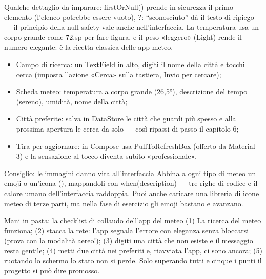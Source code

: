 Qualche dettaglio da imparare: firstOrNull() prende in sicurezza il primo elemento (l'elenco potrebbe essere vuoto), ?: “sconosciuto” dà il testo di ripiego — il principio della null safety vale anche nell'interfaccia. La temperatura usa un corpo grande come 72.sp per fare figura, e il peso «leggero» (Light) rende il numero elegante: è la ricetta classica delle app meteo.



\begin{itemize}
  \item Campo di ricerca: un TextField in alto, digiti il nome della città e tocchi cerca (imposta l'azione «Cerca» sulla tastiera, Invio per cercare);
  \item Scheda meteo: temperatura a corpo grande (26,5°), descrizione del tempo (sereno), umidità, nome della città;
  \item Città preferite: salva in DataStore le città che guardi più spesso e alla prossima apertura le cerca da solo — così ripassi di passo il capitolo 6;
  \item Tira per aggiornare: in Compose usa PullToRefreshBox (offerto da Material 3) e la sensazione al tocco diventa subito «professionale».
\end{itemize}

\begin{tcbinfo}{Consiglio: le immagini danno vita all'interfaccia}
Abbina a ogni tipo di meteo un emoji o un'icona (), mappandoli con when(description) — tre righe di codice e il calore umano dell'interfaccia raddoppia. Puoi anche caricare una libreria di icone meteo di terze parti, ma nella fase di esercizio gli emoji bastano e avanzano.

\end{tcbinfo}

\begin{tcbpractice}{Mani in pasta: la checklist di collaudo dell'app del meteo}
(1) La ricerca del meteo funziona; (2) stacca la rete: l'app segnala l'errore con eleganza senza bloccarsi (prova con la modalità aereo!); (3) digiti una città che non esiste e il messaggio resta gentile; (4) metti due città nei preferiti e, riavviata l'app, ci sono ancora; (5) ruotando lo schermo lo stato non si perde. Solo superando tutti e cinque i punti il progetto si può dire promosso.

\end{tcbpractice}

